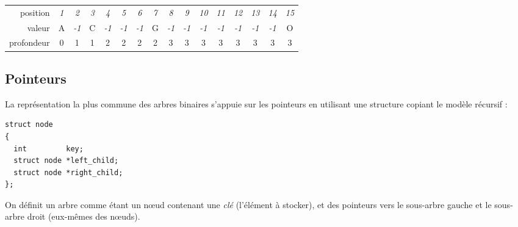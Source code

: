 \documentclass[11pt,a4paper]{article}
\begin{document}
\begin{center}
\begin{tabular}{ r c cc cccc cccccccc }
position   & \textit{1} & \textit{2} & \textit{3} & \textit{4} & \textit{5} & \textit{6} & \textit{7} &
             \textit{8} & \textit{9} & \textit{10} & \textit{11} & \textit{12} & \textit{13} &
			 \textit{14} & \textit{15} \\
\cline{2-16}
valeur     & \multicolumn{1}{|c|}{A} &
\multicolumn{1}{c|}{\footnotesize \textit{-1}} & \multicolumn{1}{c|}{C} &
\multicolumn{1}{c|}{\footnotesize \textit{-1}} & \multicolumn{1}{c|}{\footnotesize \textit{-1}} &
  \multicolumn{1}{c|}{\footnotesize \textit{-1}} & \multicolumn{1}{c|}{G} &
\multicolumn{1}{c|}{\footnotesize \textit{-1}} & \multicolumn{1}{c|}{\footnotesize \textit{-1}} & \multicolumn{1}{c|}{\footnotesize \textit{-1}} & \multicolumn{1}{c|}{\footnotesize \textit{-1}} &
  \multicolumn{1}{c|}{\footnotesize \textit{-1}} & \multicolumn{1}{c|}{\footnotesize \textit{-1}} & \multicolumn{1}{c|}{\footnotesize \textit{-1}} & \multicolumn{1}{c|}{O} \\
\cline{2-16}
profondeur & 0 &
             1 & 1 &
             2 & 2 & 2 & 2 &
             3 & 3 & 3 & 3 & 3 & 3 & 3 & 3 \\
\end{tabular}
\end{center}




\clearpage

\subsection{Pointeurs}

La représentation la plus commune des arbres binaires s'appuie sur les pointeurs en utilisant une structure copiant le modèle récursif :

\medskip

\lstset{language=C}
\begin{lstlisting}[frame=single]
struct node
{
  int         key;
  struct node *left_child;
  struct node *right_child;
};
\end{lstlisting}

\vspace*{-0.25cm}

On définit un arbre comme étant un nœud contenant une \textit{clé} (l'élément à stocker), et des pointeurs vers le sous-arbre gauche et le sous-arbre droit (eux-mêmes des nœuds).
\end{document}
